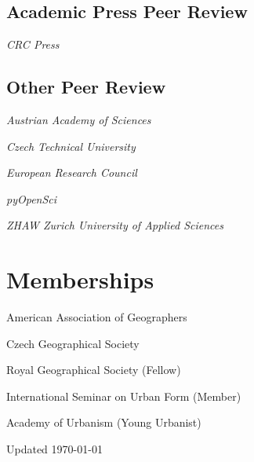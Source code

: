 \documentclass[12pt,a4paper]{report}
\newcommand{\listitemspace}{0.25em}
\renewenvironment{itemize}
{\begin{list}{}{\setlength{\leftmargin}{0em}
                \setlength{\parskip}{0em}
                \setlength{\itemsep}{\listitemspace}
                \setlength{\parsep}{\listitemspace}}}
{\end{list}}
\begin{document}
    \subsection*{Academic Press Peer Review}

    \begin{itemize}

        \item \textit{CRC Press}

    \end{itemize}

    \subsection*{Other Peer Review}

    \begin{itemize}

        \item \textit{Austrian Academy of Sciences}
        \item \textit{Czech Technical University}
        \item \textit{European Research Council}
        \item \textit{pyOpenSci}
        \item \textit{ZHAW Zurich University of Applied Sciences}

    \end{itemize}

    \section*{Memberships}

    \begin{tablist}

        \item[2025--] \tab{}American Association of Geographers
        \item[2025--] \tab{}Czech Geographical Society
        \item[2021--] \tab{}Royal Geographical Society (Fellow)
        \item[2019--] \tab{}International Seminar on Urban Form (Member)
        \item[2018--22] \tab{}Academy of Urbanism (Young Urbanist)

    \end{tablist}

    \begin{center}
        \vfill
        Updated \monthyeardate\today
    \end{center}
\end{document}
